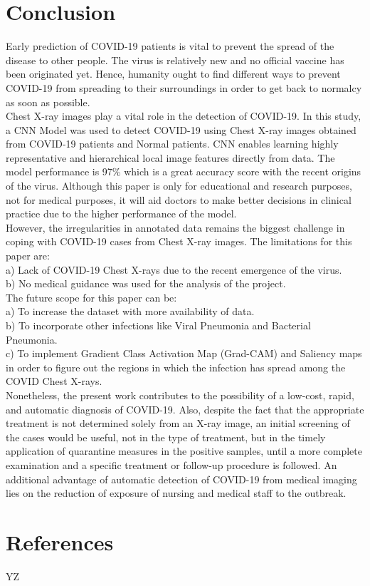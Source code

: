 \documentclass[12pt]{revtex4}
\begin{document}
\section{Conclusion}
Early prediction of COVID-19 patients is vital to prevent the spread of the disease to other people. The virus is relatively new and no official vaccine has been originated yet. Hence, humanity ought to find different ways to prevent COVID-19 from spreading to their surroundings in order to get back to normalcy as soon as possible. 
\\Chest X-ray images play a vital role in the detection of COVID-19. In this study, a CNN Model was used to detect COVID-19 using Chest X-ray images obtained from COVID-19 patients and Normal patients. CNN enables learning highly representative and hierarchical local image features directly from data. The model performance is 97\% which is a great accuracy score with the recent origins of the virus. Although this paper is only for educational and research purposes, not for medical purposes, it will aid doctors to make better decisions in clinical practice due to the higher performance of the model. 
\\However, the irregularities in annotated data remains the biggest challenge in coping with COVID-19 cases from Chest X-ray images. The limitations for this paper are:
\\a)	Lack of COVID-19 Chest X-rays due to the recent emergence of the virus. 
\\b)	No medical guidance was used for the analysis of the project. 
\\The future scope for this paper can be:
\\a)	To increase the dataset with more availability of data.
\\b)	To incorporate other infections like Viral Pneumonia and Bacterial Pneumonia.
\\c)	 To implement Gradient Class Activation Map (Grad-CAM) and Saliency maps in order to figure out the regions in which the infection has spread among the COVID Chest X-rays.
\\Nonetheless, the present work contributes to the possibility of a low-cost, rapid, and automatic diagnosis of COVID-19. Also, despite the fact that the appropriate treatment is not determined solely from an X-ray image, an initial screening of the cases would be useful, not in the type of treatment, but in the timely application of quarantine measures in the positive samples, until a more complete examination and a specific treatment or follow-up procedure is followed. An additional advantage of automatic detection of COVID-19 from medical imaging lies on the reduction of exposure of nursing and medical staff to the outbreak. 

\pagebreak
\section{References}
YZ
\end{document}
